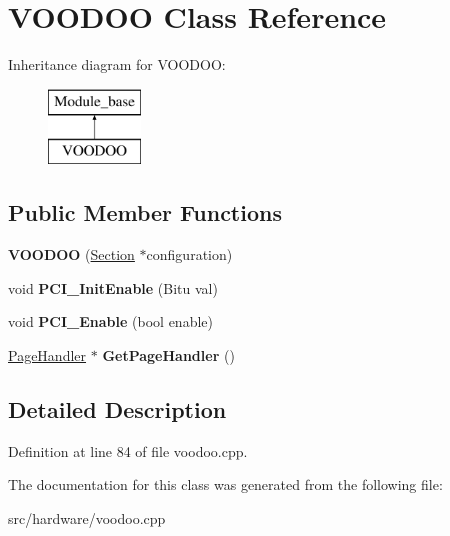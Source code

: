 \hypertarget{classVOODOO}{\section{V\-O\-O\-D\-O\-O Class Reference}
\label{classVOODOO}
}
Inheritance diagram for V\-O\-O\-D\-O\-O\-:\begin{figure}[H]
\begin{center}
\leavevmode
\includegraphics[height=2.000000cm]{classVOODOO}
\end{center}
\end{figure}
\subsection*{Public Member Functions}
\begin{DoxyCompactItemize}
\item 
\hypertarget{classVOODOO_af87e97c8e7fede9c630ae0d27c99f3fb}{{\bfseries V\-O\-O\-D\-O\-O} (\hyperlink{classSection}{Section} $\ast$configuration)}\label{classVOODOO_af87e97c8e7fede9c630ae0d27c99f3fb}

\item 
\hypertarget{classVOODOO_a62a9a30d2ff3ae6afcd34602db0efc91}{void {\bfseries P\-C\-I\-\_\-\-Init\-Enable} (Bitu val)}\label{classVOODOO_a62a9a30d2ff3ae6afcd34602db0efc91}

\item 
\hypertarget{classVOODOO_a84607f3bebd1929e1d75c5c73b0a4c02}{void {\bfseries P\-C\-I\-\_\-\-Enable} (bool enable)}\label{classVOODOO_a84607f3bebd1929e1d75c5c73b0a4c02}

\item 
\hypertarget{classVOODOO_aae743d2b96dea4751ed89e288a4228bf}{\hyperlink{classPageHandler}{Page\-Handler} $\ast$ {\bfseries Get\-Page\-Handler} ()}\label{classVOODOO_aae743d2b96dea4751ed89e288a4228bf}

\end{DoxyCompactItemize}


\subsection{Detailed Description}


Definition at line 84 of file voodoo.\-cpp.



The documentation for this class was generated from the following file\-:\begin{DoxyCompactItemize}
\item 
src/hardware/voodoo.\-cpp\end{DoxyCompactItemize}
